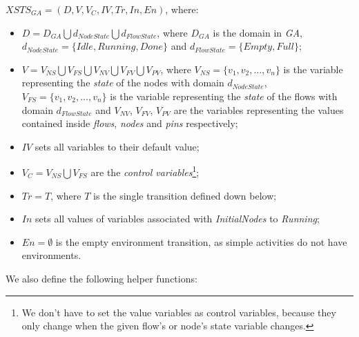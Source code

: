 \begin{definition}
	\( \mathit{XSTS_{GA}} = (D, V, V_C, \mathit{IV}, \mathit{Tr}, \mathit{In}, \mathit{En}) \), where:
	
	\begin{itemize}
		\item \( D = D_\mathit{GA} \bigcup d_\mathit{NodeState} \bigcup d_\mathit{FlowState} \), where \(D_\mathit{GA}\) is the domain in \emph{GA}, \(d_\mathit{NodeState} = \{ \mathit{Idle}, \mathit{Running}, \mathit{Done} \} \) and \(d_\mathit{FlowState} = \{ \mathit{Empty}, \mathit{Full} \} \);
		\item \( V = V_\mathit{NS} \bigcup V_\mathit{FS} \bigcup V_\mathit{NV} \bigcup V_\mathit{FV} \bigcup V_\mathit{PV} \), where \(V_\mathit{NS} = \{ v_1, v_2, \dots, v_n \} \) is the variable representing the \emph{state} of the nodes with domain \(d_\mathit{NodeState}\), \(V_\mathit{FS} = \{ v_1, v_2, \dots, v_n \} \) is the variable representing the \emph{state} of the flows with domain \(d_\mathit{FlowState}\) and \( V_\mathit{NV} \), \( V_\mathit{FV} \), \( V_\mathit{PV} \) are the variables representing the values contained inside \emph{flows}, \emph{nodes} and \emph{pins} respectively;
		\item \( IV \) sets all variables to their default value;
		\item \( V_C = V_\mathit{NS} \bigcup V_\mathit{FS} \) are the \emph{control variables}\footnote{We don't have to set the value variables as control variables, because they only change when the given flow's or node's state variable changes.};
		\item \( \mathit{Tr} = T \), where \(T\) is the single transition defined down below;
		\item \( \mathit{In} \) sets all values of variables associated with \emph{InitialNodes} to \emph{Running};
		\item \( \mathit{En} = \emptyset \) is the empty environment transition, as simple activities do not have environments.
	\end{itemize}
	
\end{definition}\label{def:activity-state}

We also define the following helper functions:


